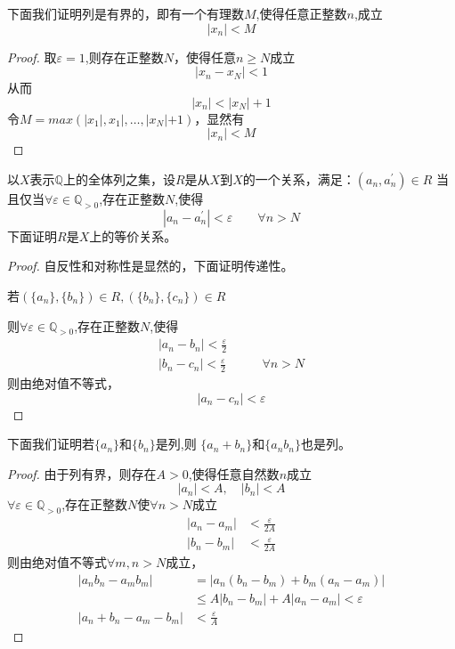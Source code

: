 \documentclass[12pt, a4paper, oneside]{ctexart}
\newcommand{\ep}{\varepsilon}
\begin{document}
下面我们证明列是有界的，即有一个有理数$M$,使得任意正整数$n$,成立
\begin{equation*}
    |x_{n}|<M
\end{equation*}
\begin{proof}
    取$\ep=1$,则存在正整数$N$，使得任意$n\ge N$成立
    \begin{equation*}
        |x_{n}-x_{N}|<1
    \end{equation*}
    从而
    \begin{equation*}
        |x_{n}|<|x_{N}|+1
    \end{equation*}
    令$M=max(|x_{1}|,x_{1}|,\dots,|x_{N}|+1)$，显然有
    \begin{equation*}
        |x_{n}| < M
    \end{equation*}
\end{proof}
以$X$表示$\mathbb{Q}$上的全体列之集，设$R$是从$X$到$X$的一个关系，满足：$({a_{n},{a_{n}^{\prime}}})\in R$
当且仅当$\forall \ep \in \mathbb{Q}_{>0}$,存在正整数$N$,使得
\begin{equation*}
    |{a_{n}-{a_{n}^{\prime}}}|<\ep \qquad \forall n>N
\end{equation*}
下面证明$R$是$X$上的等价关系。
\begin{proof}
    自反性和对称性是显然的，下面证明传递性。

    若$(\{a_{n}\},\{b_{n}\})\in R,(\{b_{n}\},\{c_{n}\})\in R$

    则$\forall \ep \in \mathbb{Q}_{>0}$,存在正整数$N$,使得
    \begin{align*}
        |{a_{n}-{b_{n}}}|<\frac{\ep}{2}                      \\
        |{b_{n}-{c_{n}}}|<\frac{\ep}{2} & \qquad \forall n>N
    \end{align*}
    则由绝对值不等式，
    \begin{equation*}
        |{a_{n}-{c_{n}}}|<\ep
    \end{equation*}
\end{proof}
下面我们证明若$\{a_{n}\}\text{和} \{b_{n}\}$是列,则
$\{a_{n}+b_{n}\} $和$\{a_{n} b_{n}\}$也是列。
\begin{proof}
    由于列有界，则存在$A>0$,使得任意自然数$n$成立
    \begin{equation*}
        |a_{n}|<A,\quad |b_{n}|<A
    \end{equation*}
    $\forall \ep \in \mathbb{Q}_{>0}$,存在正整数$N$使$\forall n>N$成立
    \begin{align*}
        |a_{n}-a_{m}| & <\frac{\ep}{2A} \\
        |b_{n}-b_{m}| & <\frac{\ep}{2A}
    \end{align*}
    则由绝对值不等式$\forall m,n>N$成立，
    \begin{align*}
        |a_{n}b_{n}-a_{m}b_{m}|   & =|a_{n}(b_{n}-b_{m})+b_{m}(a_{n}-a_{m})| \\
                                  & \le A|b_{n}-b_{m}|+A|a_{n}-a_{m}|<\ep    \\
        |a_{n}+b_{n}-a_{m}-b_{m}| & <\frac{\ep}{A}
    \end{align*}
\end{proof}
\end{document}
